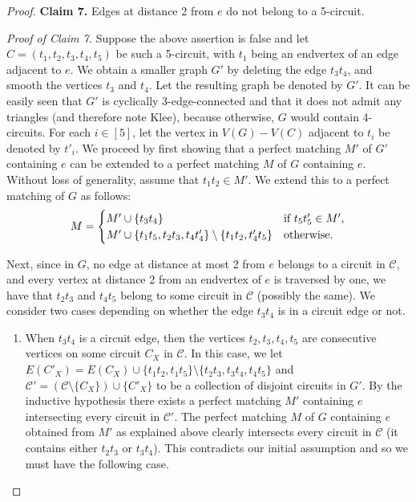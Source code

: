 \documentclass[]{theclass}
\begin{document}
\begin{proof}
\noindent\textbf{Claim 7.} Edges at distance 2 from $e$ do not belong to a 5-circuit.

\noindent\emph{Proof of Claim 7.} Suppose the above assertion is false and let $C=(t_1,t_2,t_3,t_4,t_5)$ be such a 5-circuit, with $t_1$ being an endvertex of an edge adjacent to $e$. We obtain a smaller graph $G'$ by deleting the edge $t_3t_4$, and smooth the vertices $t_3$ and $t_4$. Let the resulting graph be denoted by $G'$. It can be easily seen that $G'$ is cyclically 3-edge-connected and that it does not admit any triangles (and therefore note Klee), because otherwise, $G$ would contain 4-circuits. For each $i\in[5]$, let the vertex in $V(G)-V(C)$ adjacent to $t_i$ be denoted by $t'_i$. We proceed by first showing that a perfect matching $M'$ of $G'$ containing $e$ can be extended to a perfect matching $M$ of $G$ containing $e$. Without loss of generality, assume that $t_1t_2\in M'$. We extend this to a perfect matching of $G$ as follows: 
\[M =
  \begin{cases}
  M'\cup \{t_3t_4\} & $if $t_5t'_5\in M'$,$\\
  M'\cup \{t_1t_5,t_2t_3,t_4t'_4\} \setminus \{t_1t_2,t'_4t_5\} & $otherwise.$
  \end{cases}\]

Next, since in $G$, no edge at distance at most 2 from $e$ belongs to a circuit in $\mathcal{C}$, and every vertex at distance 2 from an endvertex of $e$ is traversed by one, we have that $t_2t_3$ and $t_4t_5$ belong to some circuit in $\mathcal{C}$ (possibly the same). We consider two cases depending on whether the edge $t_3t_4$ is in a circuit edge or not. 

\begin{enumerate}[label=(\roman*)]
\item When $t_3t_4$ is a circuit edge, then the vertices $t_2,t_3,t_4,t_5$ are consecutive vertices on some circuit $C_X$ in $\mathcal{C}$. In this case, we let 
$E(C'_X)=E(C_X)\cup \{t_1t_2,t_1t_5\}\setminus\{t_2t_3,t_3t_4,t_4t_5\}$
and $\mathcal{C}'=(\mathcal{C}\setminus\{C_X\})\cup \{C'_X\}$  to be a collection of disjoint circuits in $G'$. By the inductive hypothesis there exists a perfect matching $M'$ containing $e$ intersecting every circuit in $\mathcal{C}'$. The perfect matching $M$ of $G$ containing $e$ obtained from $M'$ as explained above clearly intersects every circuit in $\mathcal{C}$ (it contains either $t_2t_3$ or $t_3t_4$). This contradicts our initial assumption and so we must have the following case.


\end{enumerate}
\end{proof}
\end{document}

